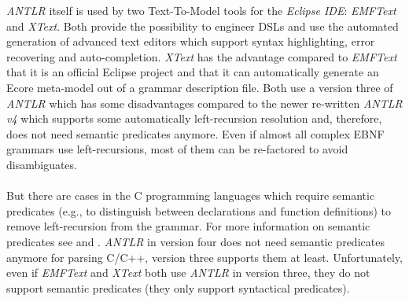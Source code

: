 {\it ANTLR} itself is used by two Text-To-Model tools for the 
{\it Eclipse IDE}:
{\it EMFText} and {\it XText}. 
Both provide the possibility to engineer DSLs and use the automated 
generation of advanced text editors which support syntax highlighting,
error recovering and auto-completion. 
{\it XText} has the advantage compared to {\it EMFText} that it is
an official Eclipse project and that it can automatically generate
an Ecore meta-model out of a grammar description file. 
Both use a version three of {\it ANTLR}
\cite{ANTLR4_XText}
\cite{ANTLR4_EMFText}
which has some disadvantages
compared to the newer re-written {\it ANTLR v4} which supports
some automatically left-recursion resolution and, therefore,
does not need semantic predicates anymore.
Even if almost all complex EBNF grammars 
use left-recursions,
most of them can be re-factored to avoid disambiguates.
\\ \ \\
But there are cases in the C programming languages
which require semantic predicates
(e.g., to distinguish between declarations
and function definitions) to remove left-recursion from the grammar. 
For more information on semantic predicates see 
\cite{parr1994adding} and \cite{SemPreds}.
{\it ANTLR} in version four does not need semantic predicates anymore
for parsing C/C++,
version three supports them at least.
Unfortunately, even if {\it EMFText} and {\it XText} both use {\it ANTLR} in version three,
they do not support semantic predicates (they only support syntactical predicates).

